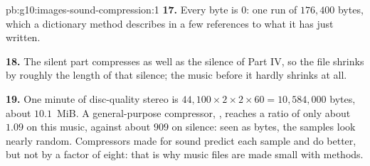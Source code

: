 \begin{solution}{pb:g10:images-sound-compression:1}
\textbf{17.} Every byte is $0$: one run of $176{,}400$ bytes, which a dictionary method describes in a few
references to what it has just written.

\textbf{18.} The silent part compresses as well as the silence of Part IV, so the file shrinks by roughly the length of
that silence; the music before it hardly shrinks at all.

\textbf{19.} One minute of disc-quality stereo is $44{,}100 \times 2 \times 2 \times 60 = 10{,}584{,}000$ bytes, about
$10.1$~MiB. A general-purpose  compressor, , reaches a ratio of only about $1.09$ on this music, against
about $909$ on silence: seen as bytes, the samples look nearly random. Compressors made for sound predict each sample and
do better, but not by a factor of eight: that is why music files are made small with  methods.
\end{solution}
